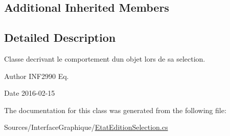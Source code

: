 \subsection*{Additional Inherited Members}


\subsection{Detailed Description}
Classe decrivant le comportement d\textquotesingle{}un objet lors de sa selection. 

\begin{DoxyAuthor}{Author}
I\+N\+F2990 Eq. 
\end{DoxyAuthor}
\begin{DoxyDate}{Date}
2016-\/02-\/15 
\end{DoxyDate}


The documentation for this class was generated from the following file\+:\begin{DoxyCompactItemize}
\item 
Sources/\+Interface\+Graphique/\hyperlink{_etat_edition_selection_8cs}{Etat\+Edition\+Selection.\+cs}\end{DoxyCompactItemize}
